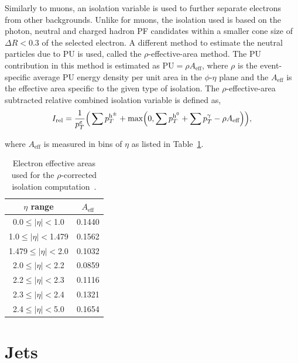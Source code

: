 Similarly to muons, an isolation variable is used to further separate electrons from other backgrounds.
Unlike for muons, the isolation used is based on the photon, neutral and charged hadron \ac{PF} candidates within a smaller cone size of $\Delta R<0.3$ of the selected electron.
A different method to estimate the neutral particles due to \ac{PU} is used, called the $\rho$-effective-area method. 
The \ac{PU} contribution in this method is estimated as $\text{PU}=\rho A_{\text{eff}}$, where $\rho$ is the event-specific average \ac{PU} energy density per unit area in the $\phi$-$\eta$ plane and the $A_{\text{eff}}$ is the effective area specific to the given type of isolation. 
The $\rho$-effective-area subtracted relative combined isolation variable is defined as,
\begin{equation}
\label{eqn:electron_reliso_rho}
I_{\text{rel}} = \frac{1}{p_{T}^{e}} \Big( \sum p_{T}^{\text{h}^{\pm}} + \text{max}\Big( 0, \sum p_{T}^{\text{h}^0} + \sum p_{T}^{\gamma} - \rho A_{\text{eff}} \Big) \Big),
\end{equation}

where $A_{\text{eff}}$ is measured in bins of $\eta$ as listed in Table~\ref{tab:EleEA}.

\begin{table}[htb]
\begin{center}
\begin{tabular}{|c|c|}
\hline
$\eta$ range & $A_{\text{eff}}$ \\
\hline
\hline
0.0$\leq|\eta|<$1.0   &  0.1440 \\
1.0$\leq|\eta|<$1.479 &  0.1562 \\
1.479$\leq|\eta|<$2.0 &  0.1032 \\
2.0$\leq|\eta|<$2.2   &  0.0859 \\
2.2$\leq|\eta|<$2.3   &  0.1116 \\
2.3$\leq|\eta|<$2.4   &  0.1321 \\
2.4$\leq|\eta|<$5.0   &  0.1654 \\
\hline
\end{tabular}
\end{center}
\caption[Electron effective areas used for the $\rho$-corrected isolation computation.]{
 Electron effective areas used for the $\rho$-corrected isolation computation~\cite{CMS:2015xaf}.
}
\label{tab:EleEA}
\end{table}

\section{Jets}

